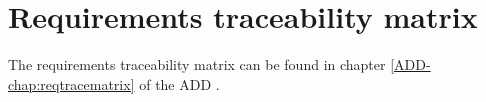 \chapter{Requirements traceability matrix}
\label{chap:matrix}

The requirements traceability matrix can be found in chapter \ref*{ADD-chap:reqtracematrix} of the ADD \cite{add}.